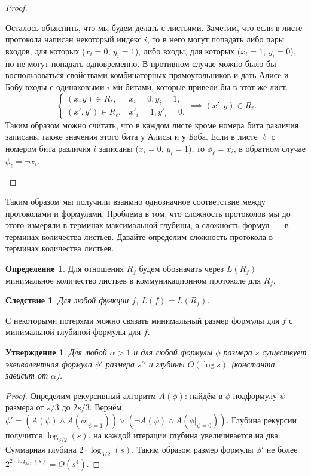 \documentclass[12pt]{article}
\theoremstyle{definition}
\newtheorem{definition}{Определение}[section]
\theoremstyle{plain}
\newtheorem{statement}{Утверждение}[section]
\newtheorem{corollary}{Следствие}[section]
\theoremstyle{remark}
\begin{document}
\begin{proof}
\begin{itemize}
            Осталось объяснить, что мы будем делать с листьями. Заметим, что если в листе протокола
            написан некоторый индекс $i$, то в него могут попадать либо пары входов, для которых 
            ($x_i = 0$, $y_i=1$), либо входы, для которых ($x_i=1$, $y_i=0$), но не могут попадать
            одновременно. В противном случае можно было бы воспользоваться свойствами 
            комбинаторных прямоугольников и дать Алисе и Бобу входы с одинаковыми $i$-ми битами,
            которые привели бы в этот же лист.
            $$\begin{cases}
                (x,y)\in R_\ell, & x_i = 0, y_i = 1,\\
                (x',y')\in R_\ell, & x'_i = 1, y'_i = 0.
              \end{cases} \implies (x', y) \in R_\ell.
            $$
            Таким образом можно считать, что в каждом листе кроме номера бита различия записаны
            также значения этого бита у Алисы и у Боба. Если в листе $\ell$ с номером бита различия $i$
            записаны ($x_i = 0$, $y_i = 1$), то $\phi_\ell = x_i$, в обратном случае
            $\phi_\ell = \neg x_i$. 
    \end{itemize}
\end{proof}

Таким образом мы получили взаимно однозначное соответствие между протоколами и формулами.
Проблема в том, что сложность протоколов мы до этого измеряли в терминах максимальной 
глубины, а сложность формул~--- в терминах количества листьев. Давайте определим сложность
протокола в терминах количества листьев.

\begin{definition}
    Для отношения $R_f$ будем обозначать через $L(R_f)$ минимальное количество
    листьев в коммуникационном протоколе для $R_f$.
\end{definition}

\begin{corollary}
    Для любой функции $f$, $L(f) = L(R_f)$.
\end{corollary}

С некоторыми потерями можно связать минимальный размер формулы для $f$ с минимальной глубиной формулы для $f$.
\begin{statement}
    Для любой $\alpha > 1$  и для любой формулы $\phi$ размера $s$ существует эквивалентная
    формула $\phi'$ размера $s^\alpha$ и глубины $O(\log s)$ (константа зависит от $\alpha$).
\end{statement}
\begin{proof}
    Определим рекурсивный алгоритм $A(\phi)$:
    найдём в $\phi$ подформулу $\psi$ размера от $s/3$ до $2s/3$. 
    Вернём $\phi' = (A(\psi) \land A(\phi|_{\psi = 1}))\lor(\neg A(\psi) \land A(\phi|_{\psi = 0})).$
    Глубина рекурсии получится $\log_{3/2}(s)$, на каждой итерации глубина увеличивается на два.
    Суммарная глубина $2\cdot \log_{3/2}(s)$. Таким образом размер формулы $\phi'$ не более
    $2^{2\cdot\log_{3/2}(s)} = O(s^4).$
\end{proof}
\end{document}
